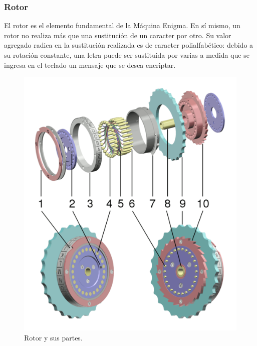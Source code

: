 \documentclass[a4paper,10pt]{article}
\begin{document}
\subsubsection{Rotor}

El rotor es el elemento fundamental de la Máquina Enigma. En sí mismo, un rotor no realiza más que una sustitución de un caracter por otro. Su valor agregado radica en la sustitución realizada es de caracter polialfabético: debido a su rotación constante, una letra puede ser sustituida por varias a medida que se ingresa en el teclado un mensaje que se desea encriptar. 

\begin{figure}
    \includegraphics[width=1\linewidth]{enigma-rotor.png} 
    \caption{Rotor y sus partes.\cite{wikimedia1}}
    \label{fig:wrapfig}
\end{figure}
\end{document}
